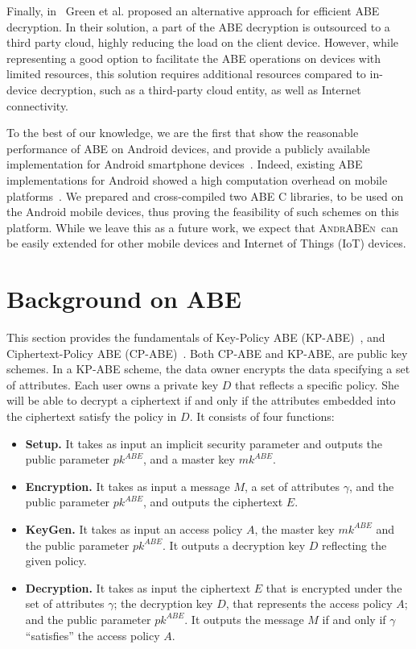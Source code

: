 \documentclass{sig-alternate-2013}
\newcommand{\pk}{pk^{ABE}}
\newcommand{\mk}{mk^{ABE}}
\newcommand{\andraben}{\textsc{AndrABEn}}
\begin{document}
Finally, in~\cite{green2011outsourcing} Green et al. proposed an alternative approach for efficient ABE decryption. In their solution, a part of the ABE decryption is outsourced to a third party cloud, highly reducing the load on the client device. However, while representing a good option to facilitate the ABE operations on devices with limited resources, this solution requires additional resources compared to in-device decryption, such as a third-party cloud entity, as well as Internet connectivity.

To the best of our knowledge, we are the first that show the reasonable performance of ABE on Android devices, and provide a publicly available implementation for Android smartphone devices~\cite{andraben_impl}. Indeed, existing ABE implementations for Android showed a high computation overhead on mobile platforms~\cite{6654173, ABE_icc_2014}. 
We prepared and cross-compiled two ABE C libraries, to be used on the Android mobile devices, thus proving the feasibility of such schemes on this platform. 
While we leave this as a future work, we expect that \andraben~can be easily extended for other mobile devices and Internet of Things (IoT) devices.


\section{Background on ABE}\label{sec:background}

This section provides the fundamentals of Key-Policy ABE (KP-ABE)~\cite{goyal2006attribute}, and Ciphertext-Policy ABE (CP-ABE)~\cite{bethencourt2007ciphertext}. Both CP-ABE and KP-ABE, are public key schemes.
In a KP-ABE scheme, the data owner encrypts the data specifying a set of attributes. Each user owns a private key $D$ that reflects a specific policy. She will be able to decrypt a ciphertext if and only if the attributes embedded into the ciphertext satisfy the policy in $D$. 
It consists of four functions:

\begin{itemize}
\item{\bf Setup.} It takes as input an implicit security parameter and outputs the public parameter $\pk$, and a master key $\mk$.

\item{\bf Encryption.} It takes as input a message $M$, a set of attributes $\gamma$, and the public parameter $\pk$, and outputs the ciphertext $E$.

\item{\bf KeyGen.} It takes as input an access policy $A$, the master key $\mk$ and the public parameter $\pk$. It outputs a decryption key $D$ reflecting the given policy.
\item{\bf Decryption.} It takes as input the ciphertext $E$ that is encrypted under the set of attributes $\gamma$; the
decryption key $D$, that represents the access policy $A$; and the public parameter $\pk$. It outputs the message $M$ if and only if $\gamma$ ``satisfies'' the access policy $A$.

\end{itemize}
\end{document}
